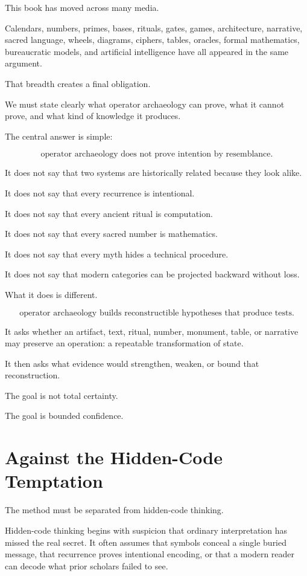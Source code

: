 \documentclass[11pt]{book}
\begin{document}
This book has moved across many media.

Calendars, numbers, primes, bases, rituals, gates, games, architecture, narrative, sacred language, wheels, diagrams, ciphers, tables, oracles, formal mathematics, bureaucratic models, and artificial intelligence have all appeared in the same argument.

That breadth creates a final obligation.

We must state clearly what operator archaeology can prove, what it cannot prove, and what kind of knowledge it produces.

The central answer is simple:

\[
\text{operator archaeology does not prove intention by resemblance.}
\]

It does not say that two systems are historically related because they look alike.

It does not say that every recurrence is intentional.

It does not say that every ancient ritual is computation.

It does not say that every sacred number is mathematics.

It does not say that every myth hides a technical procedure.

It does not say that modern categories can be projected backward without loss.

What it does is different.

\[
\text{operator archaeology builds reconstructible hypotheses that produce tests.}
\]

It asks whether an artifact, text, ritual, number, monument, table, or narrative may preserve an operation: a repeatable transformation of state.

It then asks what evidence would strengthen, weaken, or bound that reconstruction.

The goal is not total certainty.

The goal is bounded confidence.

\section{Against the Hidden-Code Temptation}

The method must be separated from hidden-code thinking.

Hidden-code thinking begins with suspicion that ordinary interpretation has missed the real secret. It often assumes that symbols conceal a single buried message, that recurrence proves intentional encoding, or that a modern reader can decode what prior scholars failed to see.
\end{document}
